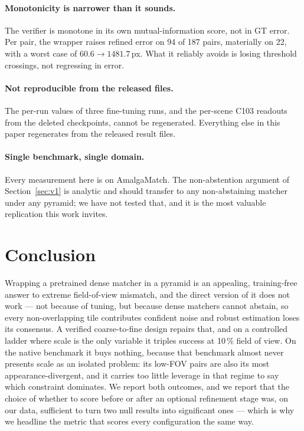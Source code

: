 \documentclass[10pt]{article}
\begin{document}
\paragraph{Monotonicity is narrower than it sounds.} The verifier is monotone in its own mutual-information score, not in GT error. Per pair, the wrapper raises refined error on 94 of 187 pairs, materially on 22, with a worst case of $60.6\rightarrow1481.7$\,px. What it reliably avoids is losing threshold crossings, not regressing in error.

\paragraph{Not reproducible from the released files.} The per-run values of three fine-tuning runs, and the per-scene C103 readouts from the deleted checkpoints, cannot be regenerated. Everything else in this paper regenerates from the released result files.

\paragraph{Single benchmark, single domain.} Every measurement here is on AmalgaMatch. The non-abstention argument of Section~\ref{sec:v1} is analytic and should transfer to any non-abstaining matcher under any pyramid; we have not tested that, and it is the most valuable replication this work invites.

\section{Conclusion}

Wrapping a pretrained dense matcher in a pyramid is an appealing, training-free answer to extreme field-of-view mismatch, and the direct version of it does not work --- not because of tuning, but because dense matchers cannot abstain, so every non-overlapping tile contributes confident noise and robust estimation loses its consensus. A verified coarse-to-fine design repairs that, and on a controlled ladder where scale is the only variable it triples success at 10\,\% field of view. On the native benchmark it buys nothing, because that benchmark almost never presents scale as an isolated problem: its low-FOV pairs are also its most appearance-divergent, and it carries too little leverage in that regime to say which constraint dominates. We report both outcomes, and we report that the choice of whether to score before or after an optional refinement stage was, on our data, sufficient to turn two null results into significant ones --- which is why we headline the metric that scores every configuration the same way.
\end{document}
